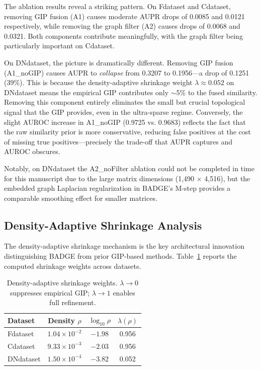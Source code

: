 \documentclass{oup-authoring-template}
\begin{document}
The ablation results reveal a striking pattern. On Fdataset and Cdataset, removing GIP fusion (A1) causes moderate AUPR drops of 0.0085 and 0.0121 respectively, while removing the graph filter (A2) causes drops of 0.0068 and 0.0321. Both components contribute meaningfully, with the graph filter being particularly important on Cdataset.

On DNdataset, the picture is dramatically different. Removing GIP fusion (A1\_noGIP) causes AUPR to \emph{collapse} from 0.3207 to 0.1956---a drop of 0.1251 (39\%). This is because the density-adaptive shrinkage weight $\lambda \approx 0.052$ on DNdataset means the empirical GIP contributes only $\sim$5\% to the fused similarity. Removing this component entirely eliminates the small but crucial topological signal that the GIP provides, even in the ultra-sparse regime. Conversely, the slight AUROC increase in A1\_noGIP (0.9725 vs. 0.9683) reflects the fact that the raw similarity prior is more conservative, reducing false positives at the cost of missing true positives---precisely the trade-off that AUPR captures and AUROC obscures.

Notably, on DNdataset the A2\_noFilter ablation could not be completed in time for this manuscript due to the large matrix dimensions (1,490 $\times$ 4,516), but the embedded graph Laplacian regularization in BADGE's M-step provides a comparable smoothing effect for smaller matrices.

\subsection{Density-Adaptive Shrinkage Analysis}

The density-adaptive shrinkage mechanism is the key architectural innovation distinguishing BADGE from prior GIP-based methods. Table~\ref{tab:lambda} reports the computed shrinkage weights across datasets.

\begin{table}[htbp]
\centering
\caption{Density-adaptive shrinkage weights. $\lambda \to 0$ suppresses empirical GIP; $\lambda \to 1$ enables full refinement.}
\label{tab:lambda}
\begin{tabular}{lccc}
\toprule
Dataset & Density $\rho$ & $\log_{10} \rho$ & $\lambda(\rho)$ \\
\midrule
Fdataset & $1.04 \times 10^{-2}$ & $-1.98$ & 0.956 \\
Cdataset & $9.33 \times 10^{-3}$ & $-2.03$ & 0.956 \\
DNdataset & $1.50 \times 10^{-4}$ & $-3.82$ & 0.052 \\
\bottomrule
\end{tabular}
\end{table}
\end{document}
